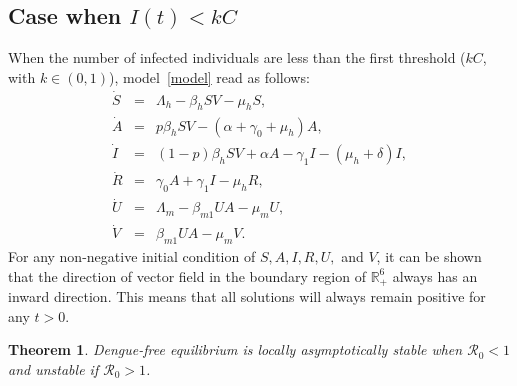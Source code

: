 \documentclass[10pt,a4paper]{amsart}
\newtheorem{theorem}{Theorem}
\begin{document}
\subsection{Case when $I(t)< kC$}
When the number of infected individuals are less than the first threshold ($kC$, with $k \in (0,1)$), model~\eqref{model} read as follows:
\begin{eqnarray}\label{modela}
    \dot{S} &=& \Lambda_h - \beta_h S V - \mu_h S, \nonumber \\
    \dot{A} &=& p \beta_h S V - \left(\alpha + \gamma_0 + \mu_h\right)A, \nonumber \\
    \dot{I} &=& (1-p)\beta_h S V + \alpha A - \gamma_1 I - (\mu_h + \delta)I, \nonumber \\
    \dot{R} &=& \gamma_0 A + \gamma_1 I - \mu_h R, \\
    \dot{U} &=& \Lambda_m - \beta_{m1}UA - \mu_m U, \nonumber \\
    \dot{V} &=& \beta_{m1}UA - \mu_m V. \nonumber
\end{eqnarray}
For any non-negative initial condition of $S, A, I, R, U,$ and $V$, it can be shown that the direction of vector field in the boundary region of $\mathbb{R}_+^6$ always has an inward direction. This means that all solutions will always remain positive for any $t>0$.

\begin{theorem}
    Dengue-free equilibrium is locally asymptotically stable when $\mathcal{R}_0<1$ and unstable if $\mathcal{R}_0>1$.
\end{theorem}
\end{document}
